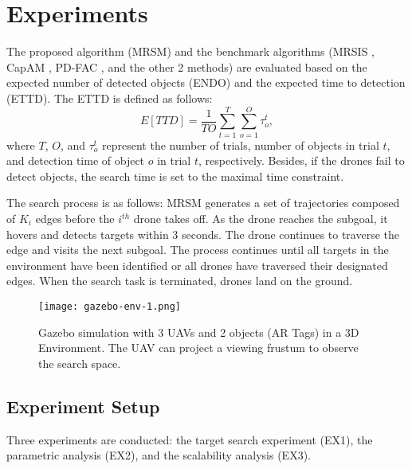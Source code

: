 \chapter{Experiments}
The proposed algorithm (MRSM) and the benchmark algorithms (MRSIS \cite{li2024mrsis}, CapAM \cite{paull2022learning}, PD-FAC \cite{sheng2022pd}, and the other 2 methods) are evaluated based on the expected number of detected objects (ENDO) and the expected time to detection (ETTD).
The ETTD is defined as follows:
\begin{equation*}
  E[TTD] = \frac{1}{TO}\sum_{t=1}^{T}\sum_{o=1}^{O}\tau^t_o,
\end{equation*}
where $T$, $O$, and $\tau^t_o$ represent the number of trials, number of objects in trial $t$, and detection time of object $o$ in trial $t$, respectively.
Besides, if the drones fail to detect objects, the search time is set to the maximal time constraint.

The search process is as follows: MRSM generates a set of trajectories composed of $K_i$ edges before the $i^{th}$ drone takes off. As the drone reaches the subgoal, it hovers and detects targets within 3 seconds. The drone continues to traverse the edge and visits the next subgoal. The process continues until all targets in the environment have been identified or all drones have traversed their designated edges.
When the search task is terminated, drones land on the ground.

\begin{figure}[htbp]
\centerline{\texttt{[image: gazebo-env-1.png]}}
\caption{
Gazebo simulation with 3 UAVs and 2 objects (AR Tags) in a 3D Environment.
The UAV can project a viewing frustum to observe the search space.
}
\label{environment}
\end{figure}

\section{Experiment Setup}
Three experiments are conducted: the target search experiment (EX1), the parametric analysis (EX2), and the scalability analysis (EX3).

